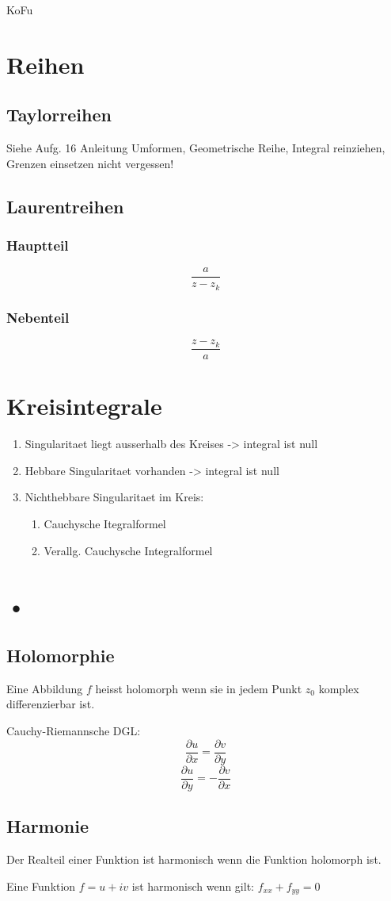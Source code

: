 \documentclass[10pt,a4paper]{article}
\begin{document}
KoFu

\section{Reihen}
\subsection{Taylorreihen}
Siehe Aufg. 16 Anleitung
Umformen, Geometrische Reihe, Integral reinziehen, Grenzen einsetzen nicht vergessen!


\subsection{Laurentreihen}
\subsubsection{Hauptteil}
\[
\frac{a}{z-z_k}
\]
\subsubsection{Nebenteil}
\[
\frac{z-z_k}{a}
\]

\section{Kreisintegrale}
\begin{enumerate}
\item Singularitaet liegt ausserhalb des Kreises -> integral ist null
\item Hebbare Singularitaet vorhanden -> integral ist null
\item Nichthebbare Singularitaet im Kreis:
\begin{enumerate}
\item Cauchysche Itegralformel
\item Verallg. Cauchysche Integralformel
\end{enumerate}
\end{enumerate}

\section{•}
\subsection{Holomorphie}
Eine Abbildung $f$ heisst holomorph wenn sie in jedem Punkt $z_0$ komplex differenzierbar ist.

Cauchy-Riemannsche DGL:
\[
\frac{\partial u}{\partial x} = \frac{\partial v}{\partial y}
\]\[
\frac{\partial u}{\partial y} = - \frac{\partial v}{\partial x}
\]

\subsection{Harmonie}
Der Realteil einer Funktion ist harmonisch wenn die Funktion holomorph ist.

Eine Funktion $f=u + iv$ ist harmonisch wenn gilt: $f_{xx} + f_{yy} = 0$
\end{document}
